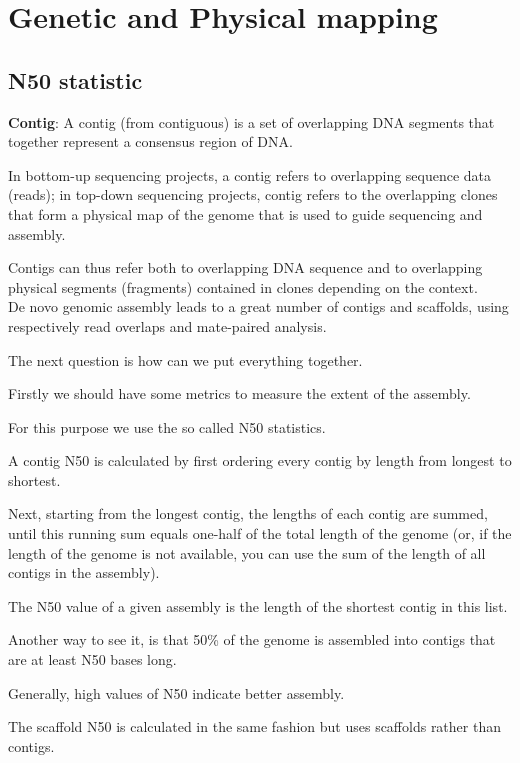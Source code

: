 \section{Genetic and Physical mapping}

\subsection{N50 statistic}

\textbf{Contig}: A contig (from contiguous) is a set of overlapping DNA
segments that together represent a consensus region of DNA.

In bottom-up sequencing projects, a contig refers to overlapping sequence
data (reads); in top-down sequencing projects, contig refers to the
overlapping clones that form a physical map of the genome that is used
to guide sequencing and assembly.

Contigs can thus refer both to overlapping DNA sequence and to overlapping
physical segments (fragments) contained in clones depending on the context. \\


De novo genomic assembly leads to a great number of contigs and scaffolds,
using respectively read overlaps and mate-paired analysis.

The next question is how can we put everything together.


Firstly we should have some metrics to measure the extent of the assembly.

For this purpose we use the so called N50 statistics.

A contig N50 is calculated by first ordering every contig by length from
longest to shortest.

Next, starting from the longest contig, the lengths of each contig are
summed, until this running sum equals one-half of the total length of the
genome (or, if the length of the genome is not available, you can use the sum
of the length of all contigs in the assembly).

The N50 value of a given assembly is the length of the shortest contig in this
list.

Another way to see it, is that 50\% of the genome is assembled into contigs
that are at least N50 bases long.

Generally, high values of N50 indicate better assembly.

The scaffold N50 is calculated in the same fashion but uses scaffolds rather
than contigs.

